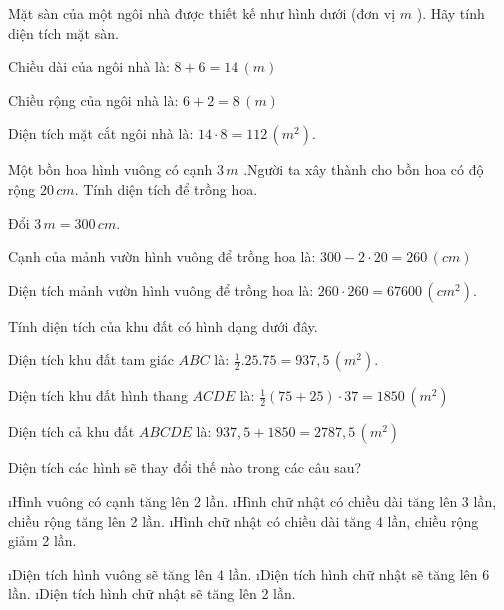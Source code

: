 \begin{bt}
	Mặt sàn của một ngôi nhà được thiết kế như hình dưới (đơn vị  $m$ ). Hãy tính diện tích mặt sàn.
	\begin{loigiaichuong37}
		Chiều dài của ngôi nhà là:  $8+6=14\,(m)$ 
		
		Chiều rộng của ngôi nhà là:  $6+2=8\,(m)$ 
		
		Diện tích mặt cắt ngôi nhà là:  $14\cdot8=112 \,(m^2).$ 
	\end{loigiaichuong37}
\end{bt}
\begin{bt}
	Một bồn hoa hình vuông có cạnh $3 \,m$ .Người ta xây thành cho bồn hoa có độ rộng $20\,cm$. Tính diện tích để trồng hoa. 
	\begin{loigiaichuong37}
		Đổi  $3\, m=300 \,cm.$
		 
		Cạnh của mảnh vườn hình vuông để trồng hoa là:  $300-2\cdot20=260\, (cm)$ 
		
		Diện tích mảnh vườn hình vuông để trồng hoa là:  $260\cdot260=67600 \,(cm^2).$ 
	\end{loigiaichuong37}
\end{bt}
\begin{bt}
	Tính diện tích của khu đất có hình dạng dưới đây.
	\begin{loigiaichuong37}
		Diện tích khu đất tam giác $ABC$ là:  $\frac{1}{2}.25.75=937,5\,(m^2).$ 
		
		Diện tích khu đất hình thang $ACDE$ là:  $\frac{1}{2}(75+25)\cdot37=1850 \,(m^2)$
		 
		Diện tích cả khu đất $ABCDE$ là:  $937,5+1850=2787,5 \,(m^2)$ 
	\end{loigiaichuong37}
\end{bt}
\begin{bt}
	Diện tích các hình sẽ thay đổi thế nào trong các câu sau?
	\begin{enumerate}[a), leftmargin=*]
		\i Hình vuông có cạnh tăng lên 2 lần.
		\i Hình chữ nhật có chiều dài tăng lên 3 lần, chiều rộng tăng lên 2 lần.
		\i Hình chữ nhật có chiều dài tăng 4 lần, chiều rộng giảm 2 lần.
	\end{enumerate}
	\begin{loigiaichuong37}
		\begin{enumerate}[a), leftmargin=*]
			\i Diện tích hình vuông sẽ tăng lên 4 lần.
			\i Diện tích hình chữ nhật sẽ tăng lên 6 lần.
			\i Diện tích hình chữ nhật sẽ tăng lên 2 lần.
		\end{enumerate}
	\end{loigiaichuong37}
\end{bt}

